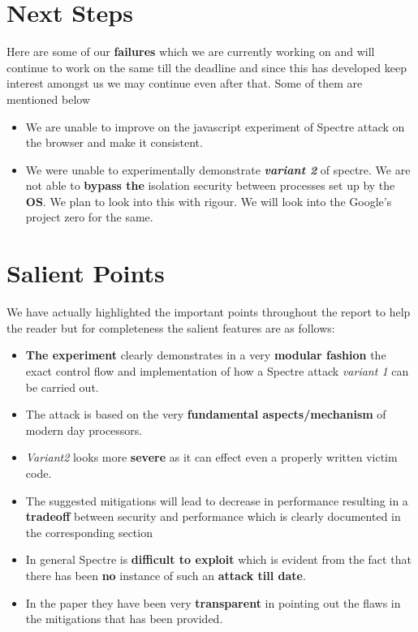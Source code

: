 \documentclass[12pt]{article}
\begin{document}
\section{Next Steps}
Here are some of our \textbf{failures} which we are currently working on and will continue to work on the same till the deadline and since this has developed keep interest amongst us we may continue even after that. Some of them are mentioned below
\begin{itemize}
	\item We are unable to improve on the javascript\cite{GITHUB_LINK} experiment of Spectre attack on the browser and make it consistent.
	\item We were unable to experimentally demonstrate \textit{\textbf{variant 2}} of spectre. We are not able to \textbf{bypass the} isolation security between processes set up by the \textbf{OS}. We plan to look into this with rigour. We will look into the Google's project zero for the same.\cite{ProjectZero}
\end{itemize}
\section{Salient Points}
We have actually highlighted the important points throughout the report to help the reader but for completeness the salient features are as follows:
\begin{itemize}
		\item \textbf{The experiment} clearly demonstrates in a very \textbf{modular fashion} the exact control flow and implementation of how a Spectre attack \textit{variant 1} can be carried out.
		
		\item The attack is based on the very \textbf{fundamental aspects/mechanism} of modern day processors.
		
		\item \textit{Variant2} looks more \textbf{severe} as it can effect even a properly written victim code.
		 
		\item The suggested mitigations will lead to decrease in performance resulting in a \textbf{tradeoff} between security and performance which is clearly documented in the corresponding section
		\item In general Spectre is \textbf{difficult to exploit} which is evident from the fact that there has been \textbf{no} instance of such an \textbf{attack till date}.
		\item In the paper\cite{Kocher2018spectre} they have been very \textbf{transparent} in pointing out the flaws in the mitigations that has been provided.

\end{itemize}
\end{document}
